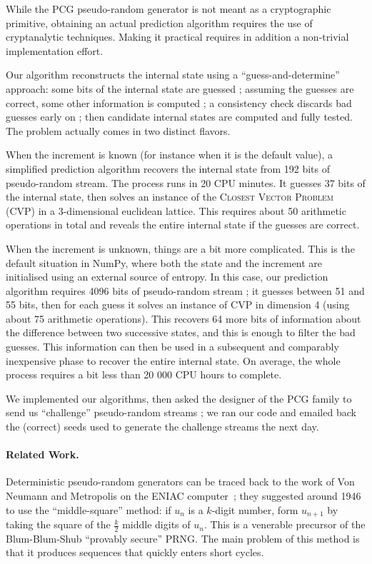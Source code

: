\documentclass[journal=tosc,final]{iacrtrans}
\begin{document}
While the \textsf{PCG} pseudo-random generator is not meant as a cryptographic
primitive, obtaining an actual prediction algorithm requires the use of
cryptanalytic techniques. Making it practical requires in addition a non-trivial
implementation effort.

Our algorithm reconstructs the internal state using a ``guess-and-determine''
approach: some bits of the internal state are guessed ; assuming the guesses are
correct, some other information is computed ; a consistency check discards bad
guesses early on ; then candidate internal states are computed and fully
tested. The problem actually comes in two distinct flavors.

When the increment is known (for instance when it is the default value), a
simplified prediction algorithm recovers the internal state from 192 bits of
pseudo-random stream. The process runs in 20 CPU minutes. It guesses 37 bits of
the internal state, then solves an instance of the \textsc{Closest Vector
  Problem} (CVP) in a 3-dimensional euclidean lattice. This requires about 50
arithmetic operations in total and reveals the entire internal state if the
guesses are correct.

When the increment is unknown, things are a bit more complicated. This is the
default situation in \textsf{NumPy}, where both the state and the increment are
initialised using an external source of entropy. In this case, our prediction
algorithm requires 4096 bits of pseudo-random stream ; it guesses between 51 and
55 bits, then for each guess it solves an instance of CVP in dimension 4 (using
about 75 arithmetic operations). This recovers 64 more bits of information about
the difference between two successive states, and this is enough to filter the
bad guesses. This information can then be used in a subsequent and comparably
inexpensive phase to recover the entire internal state. On average, the whole
process requires a bit less than 20 000 CPU hours to complete.

We implemented our algorithms, then asked the designer of the \textsf{PCG}
family to send us ``challenge'' pseudo-random streams ; we ran our code and
emailed back the (correct) seeds used to generate the challenge streams the next
day.

\paragraph{Related Work.} Deterministic pseudo-random generators can be traced
back to the work of Von Neumann and Metropolis on the ENIAC
computer~\cite{vonNeumann1951}; they suggested around 1946 to use the
``middle-square'' method: if $u_n$ is a $k$-digit number, form $u_{n+1}$ by
taking the square of the $\frac{k}{2}$ middle digits of $u_n$. This is a
venerable precursor of the Blum-Blum-Shub ``provably secure'' PRNG. The main
problem of this method is that it produces sequences that quickly enters short
cycles.
\end{document}
